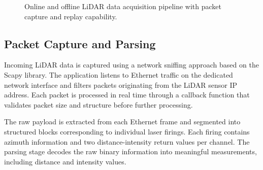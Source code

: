 \begin{figure}[htbp]
\centering
{}
\caption{Online and offline LiDAR data acquisition pipeline with packet capture and replay capability.}
\label{fig:acquisition_pipeline}
\end{figure}

\subsection{Packet Capture and Parsing}
\label{subsec:packet_capture}

Incoming LiDAR data is captured using a network sniffing approach based on the Scapy library.\cite{scapy} The application listens to Ethernet traffic on the dedicated network interface and filters packets originating from the LiDAR sensor IP address. Each packet is processed in real time through a callback function that validates packet size and structure before further processing.

The raw payload is extracted from each Ethernet frame and segmented into structured blocks corresponding to individual laser firings. Each firing contains azimuth information and two distance-intensity return values per channel. The parsing stage decodes the raw binary information into meaningful measurements, including distance and intensity values.

